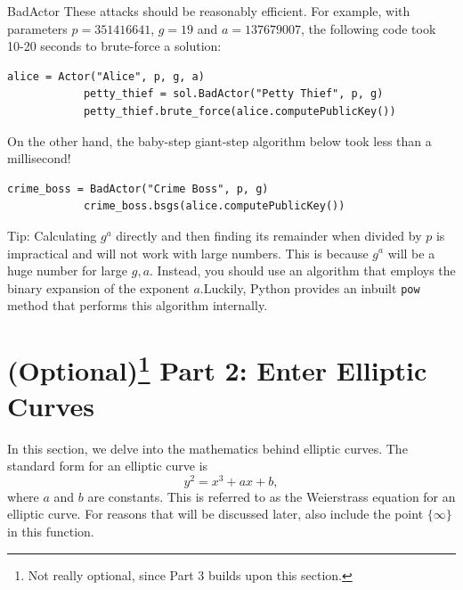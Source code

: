\documentclass{article}
\begin{document}
\begin{tcolorbox}[enhanced,interior style={top color=Plum!20,bottom color=Plum!30}]
\begin{mybox}[
            colframe=purple!50!black,
            colback=purple!30,
            colbacktitle=purple!50!white,
            coltitle=purple!30!black,
            ]{BadActor}
        These attacks should be reasonably efficient. For example, with parameters $p = 351416641$, $g = 19$ and $a = 137679007$, the following code took 10-20 seconds to brute-force a solution:
        \begin{lstlisting}[belowskip=-6pt]
            alice = Actor("Alice", p, g, a)
            petty_thief = sol.BadActor("Petty Thief", p, g)
            petty_thief.brute_force(alice.computePublicKey())
        \end{lstlisting}
        On the other hand, the baby-step giant-step algorithm below took less than a millisecond!
        \begin{lstlisting}[belowskip=-10pt]
            crime_boss = BadActor("Crime Boss", p, g)
            crime_boss.bsgs(alice.computePublicKey())
        \end{lstlisting}
        
        \end{mybox}
    
        \vspace{2mm}
        Tip: Calculating $g^{a}$ directly and then finding its remainder when divided by $p$ is impractical and will not work with large numbers. This is because $g^{a}$ will be a huge number for large $g, a$. Instead, you should use an algorithm that employs the binary expansion of the exponent $a$.\footnotemark Luckily, Python provides an inbuilt \lstinline{pow} method that performs this algorithm internally.
    \end{tcolorbox}

\section*{(Optional)\footnote{Not really optional, since Part 3 builds upon this section.} Part 2: Enter Elliptic Curves}
    In this section, we delve into the mathematics behind elliptic curves. The standard form for an elliptic curve is $$y^{2} = x^{3} + ax + b,$$ where $a$ and $b$ are constants. This is referred to as the Weierstrass equation for an elliptic curve. For reasons that will be discussed later, also include the point $\{\infty\}$ in this function.
\end{document}
